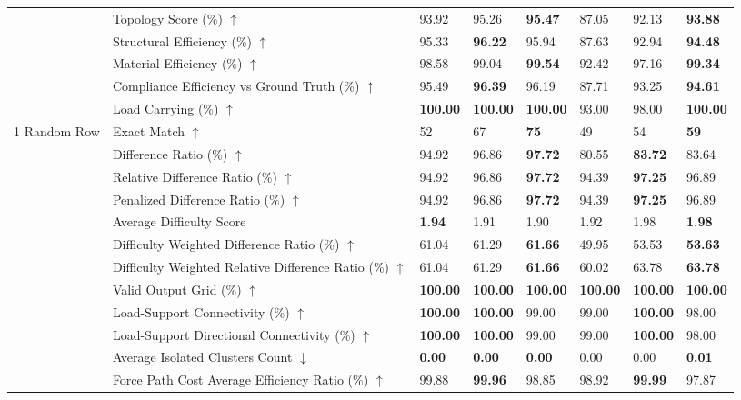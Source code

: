 \begin{table}[!h]
{\begin{tabular}{lllll|lll}
 & Topology Score (\%) $\uparrow$ & 93.92 & 95.26 & \textbf{95.47} & 87.05 & 92.13 & \textbf{93.88} \\
 & Structural Efficiency (\%) $\uparrow$ & 95.33 & \textbf{96.22} & 95.94 & 87.63 & 92.94 & \textbf{94.48} \\
 & Material Efficiency (\%) $\uparrow$ & 98.58 & 99.04 & \textbf{99.54} & 92.42 & 97.16 & \textbf{99.34} \\
 & Compliance Efficiency vs Ground Truth (\%) $\uparrow$ & 95.49 & \textbf{96.39} & 96.19 & 87.71 & 93.25 & \textbf{94.61} \\
 & Load Carrying (\%) $\uparrow$ & \textbf{100.00} & \textbf{100.00} & \textbf{100.00} & 93.00 & 98.00 & \textbf{100.00} \\
\midrule
1 Random Row & Exact Match $\uparrow$ & 52 & 67 & \textbf{75} & 49 & 54 & \textbf{59} \\
 & Difference Ratio (\%) $\uparrow$ & 94.92 & 96.86 & \textbf{97.72} & 80.55 & \textbf{83.72} & 83.64 \\
 & Relative Difference Ratio (\%) $\uparrow$ & 94.92 & 96.86 & \textbf{97.72} & 94.39 & \textbf{97.25} & 96.89 \\
 & Penalized Difference Ratio (\%) $\uparrow$ & 94.92 & 96.86 & \textbf{97.72} & 94.39 & \textbf{97.25} & 96.89 \\
 & Average Difficulty Score & \textbf{1.94} & 1.91 & 1.90 & 1.92 & 1.98 & \textbf{1.98} \\
 & Difficulty Weighted Difference Ratio (\%) $\uparrow$ & 61.04 & 61.29 & \textbf{61.66} & 49.95 & 53.53 & \textbf{53.63} \\
 & Difficulty Weighted Relative Difference Ratio (\%) $\uparrow$ & 61.04 & 61.29 & \textbf{61.66} & 60.02 & 63.78 & \textbf{63.78} \\
 & Valid Output Grid (\%) $\uparrow$ & \textbf{100.00} & \textbf{100.00} & \textbf{100.00} & \textbf{100.00} & \textbf{100.00} & \textbf{100.00} \\
 & Load-Support Connectivity (\%) $\uparrow$ & \textbf{100.00} & \textbf{100.00} & 99.00 & 99.00 & \textbf{100.00} & 98.00 \\
 & Load-Support Directional Connectivity (\%) $\uparrow$ & \textbf{100.00} & \textbf{100.00} & 99.00 & 99.00 & \textbf{100.00} & 98.00 \\
 & Average Isolated Clusters Count $\downarrow$ & \textbf{0.00} & \textbf{0.00} & \textbf{0.00} & 0.00 & 0.00 & \textbf{0.01} \\
 & Force Path Cost Average Efficiency Ratio (\%) $\uparrow$ & 99.88 & \textbf{99.96} & 98.85 & 98.92 & \textbf{99.99} & 97.87 \\

\end{tabular}}
\end{table}

